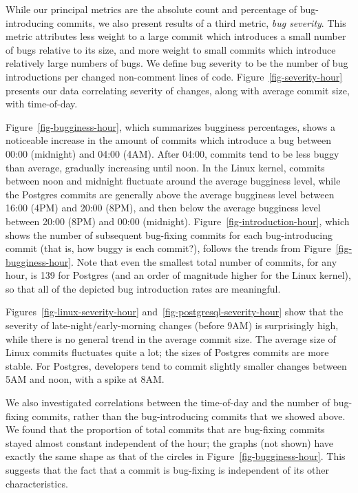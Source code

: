 While our principal metrics are the absolute count and percentage of
bug-introducing commits, we also present results of a third metric,
\emph{bug severity}. This metric attributes less weight to a large
commit which introduces a small number of bugs relative to its size,
and more weight to small commits which introduce relatively large
numbers of bugs. We define bug severity to be the number of bug
introductions per changed non-comment lines of
code. Figure~\ref{fig-severity-hour} presents our data correlating
severity of changes, along with average commit size, with time-of-day.

Figure~\ref{fig-bugginess-hour}, which summarizes bugginess
percentages, shows a noticeable increase in the amount of commits which
introduce a bug between 00:00 (midnight) and 04:00 (4AM). After 04:00,
commits tend to be less buggy than average, gradually increasing until
noon.  In the Linux kernel, commits between noon and midnight
fluctuate around the average bugginess level, while the Postgres
commits are generally above the average bugginess level between 16:00
(4PM) and 20:00 (8PM), and then below the average bugginess level
between 20:00 (8PM) and 00:00
(midnight). Figure~\ref{fig-introduction-hour},
which shows the number of subsequent bug-fixing commits for each 
bug-introducing commit (that is,
how buggy is each commit?), 
follows the trends from
Figure~\ref{fig-bugginess-hour}. Note that even the smallest
total number of commits, for any hour, is 139 for Postgres (and an
order of magnitude higher for the Linux kernel), so that all of the
depicted bug introduction rates are meaningful.

Figures~\ref{fig-linux-severity-hour}
and~\ref{fig-postgresql-severity-hour} show that the severity of
late-night/early-morning changes (before 9AM) is surprisingly high,
while there is no general trend in the average commit size.
The average size of Linux commits fluctuates quite a lot; the sizes of
Postgres commits are more stable.  For Postgres, developers tend to
commit slightly smaller changes between 5AM and noon, with a spike at 8AM.

We also investigated correlations between the time-of-day and the
number of bug-fixing commits, rather than the bug-introducing commits
that we showed above. We found that the proportion of total
commits that are bug-fixing commits stayed almost constant independent
of the hour; the graphs (not shown) have exactly the same shape as
that of the circles in Figure~\ref{fig-bugginess-hour}.
This suggests that the fact
that a commit is bug-fixing is independent of its other characteristics.

